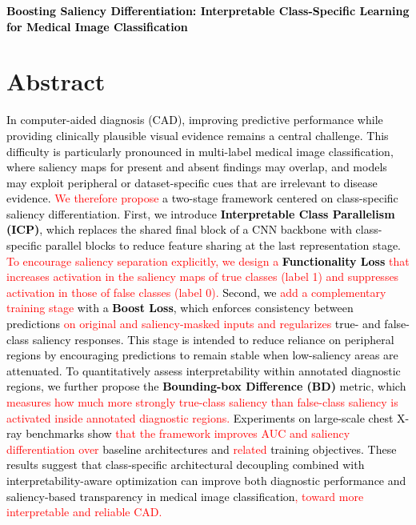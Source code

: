 \documentclass[preprint,7pt, a4paper]{elsarticle}
\begin{document}
\Large\noindent\textbf{\textcolor{black}{Boosting Saliency Differentiation: Interpretable Class-Specific Learning for Medical Image Classification}}\\
\normalsize

\section{Abstract}
\textcolor{black}{In computer-aided diagnosis (CAD), improving predictive performance while providing clinically plausible visual evidence remains a central challenge. This difficulty is particularly pronounced in multi-label medical image classification, where saliency maps for present and absent findings may overlap, and models may exploit peripheral or dataset-specific cues that are irrelevant to disease evidence. \textcolor{red}{We therefore propose} a two-stage framework centered on class-specific saliency differentiation. First, we introduce \textbf{Interpretable Class Parallelism (ICP)}, which replaces the shared final block of a CNN backbone with class-specific parallel blocks to reduce feature sharing at the last representation stage. \textcolor{red}{To encourage saliency separation explicitly, we design a} \textbf{Functionality Loss} \textcolor{red}{that increases activation in the saliency maps of true classes (label 1) and suppresses activation in those of false classes (label 0).} Second, we \textcolor{red}{add a complementary training stage} with a \textbf{Boost Loss}, which enforces consistency between predictions \textcolor{red}{on original and saliency-masked inputs and regularizes} true- and false-class saliency responses. This stage is intended to reduce reliance on peripheral regions by encouraging predictions to remain stable when low-saliency areas are attenuated. To quantitatively assess interpretability within annotated diagnostic regions, we further propose the \textbf{Bounding-box Difference (BD)} metric, which \textcolor{red}{measures how much more strongly true-class saliency than false-class saliency is activated inside annotated diagnostic regions.} Experiments on large-scale chest X-ray benchmarks show \textcolor{red}{that the framework improves AUC and saliency differentiation over} baseline architectures and \textcolor{red}{related} training objectives. These results suggest that class-specific architectural decoupling combined with interpretability-aware optimization can improve both diagnostic performance and saliency-based transparency in medical image classification\textcolor{red}{, toward more interpretable and reliable CAD.}}
\end{document}
